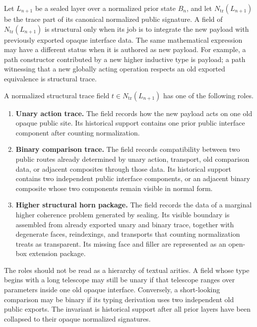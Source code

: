 \documentclass{lmcs}
\begin{document}
Let \(L_{n+1}\) be a sealed layer over a normalized prior state \(B_n\), and let
\(N_{\mathrm{tr}}(L_{n+1})\) be the trace part of its canonical normalized public signature.
A field of \(N_{\mathrm{tr}}(L_{n+1})\) is structural only when its job is to integrate the new
payload with previously exported opaque interface data.  The same mathematical expression
may have a different status when it is authored as new payload.  For example, a path
constructor contributed by a new higher inductive type is payload; a path witnessing that a
new globally acting operation respects an old exported equivalence is structural trace.

\begin{defi}
A normalized structural trace field \(t\in N_{\mathrm{tr}}(L_{n+1})\) has one of the following
roles.

\begin{enumerate}
\item \textbf{Unary action trace.}  The field records how the new payload acts on one old
opaque public site.  Its historical support contains one prior public interface component
after counting normalization.

\item \textbf{Binary comparison trace.}  The field records compatibility between two public
routes already determined by unary action, transport, old comparison data, or adjacent
composites through those data.  Its historical support contains two independent public
interface components, or an adjacent binary composite whose two components remain visible in
normal form.

\item \textbf{Higher structural horn package.}  The field records the data of a marginal
higher coherence problem generated by sealing.  Its visible boundary is assembled from
already exported unary and binary trace, together with degenerate faces, reindexings, and
transports that counting normalization treats as transparent.  Its missing face and filler are
represented as an open-box extension package.
\end{enumerate}
\end{defi}

The roles should not be read as a hierarchy of textual arities.  A field whose type begins
with a long telescope may still be unary if that telescope ranges over parameters inside one
old opaque interface.  Conversely, a short-looking comparison may be binary if its typing
derivation uses two independent old public exports.  The invariant is historical support after
all prior layers have been collapsed to their opaque normalized signatures.
\end{document}
